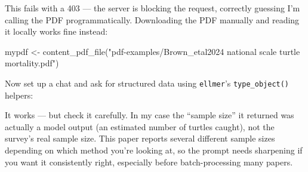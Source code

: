 \documentclass[
  letterpaper,
  DIV=11,
  numbers=noendperiod]{scrreprt}
\newenvironment{Shaded}{\begin{snugshade}}{\end{snugshade}}
\newcommand{\AttributeTok}[1]{\textcolor[rgb]{0.40,0.45,0.13}{#1}}
\newcommand{\DecValTok}[1]{\textcolor[rgb]{0.68,0.00,0.00}{#1}}
\newcommand{\FunctionTok}[1]{\textcolor[rgb]{0.28,0.35,0.67}{#1}}
\newcommand{\NormalTok}[1]{\textcolor[rgb]{0.00,0.23,0.31}{#1}}
\newcommand{\OtherTok}[1]{\textcolor[rgb]{0.00,0.23,0.31}{#1}}
\newcommand{\SpecialCharTok}[1]{\textcolor[rgb]{0.37,0.37,0.37}{#1}}
\newcommand{\StringTok}[1]{\textcolor[rgb]{0.13,0.47,0.30}{#1}}
\begin{document}
This fails with a 403 --- the server is blocking the request, correctly
guessing I'm calling the PDF programmatically. Downloading the PDF
manually and reading it locally works fine instead:

\begin{Shaded}
\begin{Highlighting}[]
\NormalTok{mypdf }\OtherTok{\textless{}{-}} \FunctionTok{content\_pdf\_file}\NormalTok{(}\StringTok{"pdf{-}examples/Brown\_etal2024 national scale turtle mortality.pdf"}\NormalTok{)}
\end{Highlighting}
\end{Shaded}

Now set up a chat and ask for structured data using \texttt{ellmer}'s
\texttt{type\_object()} helpers:

\begin{Shaded}
\end{Shaded}

It works --- but check it carefully. In my case the ``sample size'' it
returned was actually a model output (an estimated number of turtles
caught), not the survey's real sample size. This paper reports several
different sample sizes depending on which method you're looking at, so
the prompt needs sharpening if you want it consistently right,
especially before batch-processing many papers.
\end{document}
